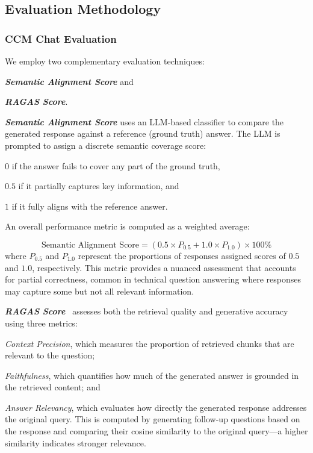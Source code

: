 \documentclass[runningheads]{llncs}
\begin{document}
\subsection{Evaluation Methodology} 

\subsubsection{CCM Chat Evaluation}
We employ two complementary evaluation techniques: \begin{inparaenum}[(i)]
    \item \textit{\textbf{Semantic Alignment Score}} and \item \textit{\textbf{RAGAS Score}}. 
\end{inparaenum}

\textit{\textbf{Semantic Alignment Score}} uses an LLM-based classifier to compare the generated response against a reference (ground truth) answer. The LLM is prompted to assign a discrete semantic coverage score: \begin{inparaenum}[(i)] \item \textbf{$0$} if the answer fails to cover any part of the ground truth, \item \textbf{$0.5$} if it partially captures key information, and \item \textbf{$1$} if it fully aligns with the reference answer. \end{inparaenum} An overall performance metric is computed as a weighted average:

$$\text{Semantic Alignment Score} = (0.5 \times P_{0.5} + 1.0 \times P_{1.0}) \times 100\%$$
 where $P_{0.5}$ and $P_{1.0}$ represent the proportions of responses assigned scores of $0.5$ and $1.0$, respectively. This metric provides a nuanced assessment that accounts for partial correctness, common in technical question answering where responses may capture some but not all relevant information.

\textit{\textbf{RAGAS Score}}~\cite{es2025ragasautomatedevaluationretrieval} assesses both the retrieval quality and generative accuracy using three metrics: \begin{inparaenum}[(i)] 
\item \textit{Context Precision}, which measures the proportion of retrieved chunks that are relevant to the question;
\item \textit{Faithfulness}, which quantifies how much of the generated answer is grounded in the retrieved content; and 
\item \textit{Answer Relevancy}, which evaluates how directly the generated response addresses the original query. This is computed by generating follow-up questions based on the response and comparing their cosine similarity to the original query—a higher similarity indicates stronger relevance.
\end{inparaenum}
\end{document}
